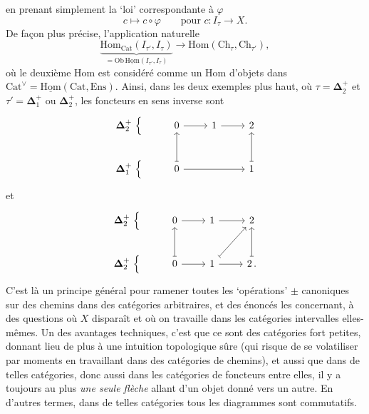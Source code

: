 \documentclass[11pt]{article}
\newcommand{\printedpage}[1]{\if\relax\detokenize{#1}\relax\else\marginpar{\raggedright\footnotesize p.~#1}\fi}
\newcommand{\msp}[1]{\marginpar{\raggedright\footnotesize [#1]}}
\newcommand{\bDelta}{\boldsymbol{\Delta}}
\newcommand{\uHom}{\underline{\mathrm{Hom}}}
\newcommand{\Hom}{\mathrm{Hom}}
\newcommand{\Cat}{\mathrm{Cat}}
\begin{document}
\printedpage{14}

en prenant simplement la ‘loi’ correspondante à $\varphi$
\[
c \longmapsto c\circ\varphi \qquad \text{pour } c : I_\tau \longrightarrow X.
\]
De façon plus précise, l'application naturelle
\[
\underbrace{\Hom_{\Cat}(I_{\tau'},I_\tau)}_{=\mathrm{Ob}\,\uHom(I_{\tau'},I_\tau)} \longrightarrow \Hom(\mathrm{Ch}_\tau,\mathrm{Ch}_{\tau'}),
\]
\msp{page 22}
où le deuxième Hom est considéré comme un Hom d'objets dans $\Cat^{\vee}=\uHom(\Cat,\mathrm{Ens})$. Ainsi, dans les deux exemples plus haut, où $\tau=\bDelta_2^+$ et $\tau'=\bDelta_1^+$ ou $\bDelta_2^+$, les foncteurs en sens inverse sont
\[
\begin{tikzcd}
\bDelta_2^+\ \Big\{ & 0 \arrow[r] & 1 \arrow[r] & 2 \\
\bDelta_1^+\ \Big\{ & 0 \arrow[u, mapsto] \arrow[rr] & & 1 \arrow[u, mapsto]
\end{tikzcd}
\]
et
\[
\begin{tikzcd}
\bDelta_2^+\ \Big\{ & 0 \arrow[r] & 1 \arrow[r] & 2 \\
\bDelta_2^+\ \Big\{ & 0 \arrow[u, mapsto] \arrow[r] & 1 \arrow[ur, mapsto] \arrow[r] & 2\,. \arrow[u, mapsto]
\end{tikzcd}
\]
C'est là un principe général pour ramener toutes les ‘opérations’ $\pm$ canoniques sur des chemins dans des catégories arbitraires, et des énoncés les concernant, à des questions où $X$ disparaît et où on travaille dans les catégories intervalles elles-mêmes. Un des avantages techniques, c'est que ce sont des catégories fort petites, donnant lieu de plus à une intuition topologique sûre (qui risque de se volatiliser par moments en travaillant dans des catégories de chemins), et aussi que dans de telles catégories, donc aussi dans les catégories de foncteurs entre elles, il y a toujours au plus
\msp{page 23}
\textit{une seule flèche} allant d'un objet donné vers un autre. En d'autres termes, dans de telles catégories tous les diagrammes sont commutatifs.
\end{document}
